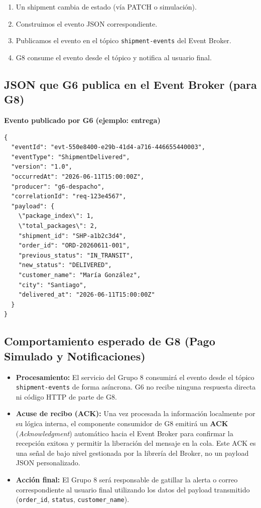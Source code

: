 \documentclass[11pt, a4paper]{article}
\newcommand{\contractheader}[1]{%
  \noindent\colorbox{primary!10}{%
    \parbox{\dimexpr\textwidth-2\fboxsep}{%
      \textbf{\faFileCode\quad #1}%
    }%
  }
  \vspace{0.3cm}
}
\begin{document}
\begin{enumerate}[noitemsep]
  \item Un shipment cambia de estado (vía PATCH o simulación).
  \item Construimos el evento JSON correspondiente.
  \item Publicamos el evento en el tópico \texttt{shipment-events} del Event Broker.
  \item G8 consume el evento desde el tópico y notifica al usuario final.
\end{enumerate}

\subsection{JSON que G6 publica en el Event Broker (para G8)}

\contractheader{Evento publicado por G6 (ejemplo: entrega)}

\begin{lstlisting}
{
  "eventId": "evt-550e8400-e29b-41d4-a716-446655440003",
  "eventType": "ShipmentDelivered",
  "version": "1.0",
  "occurredAt": "2026-06-11T15:00:00Z",
  "producer": "g6-despacho",
  "correlationId": "req-123e4567",
  "payload": {
    \"package_index\": 1,
    \"total_packages\": 2,
    "shipment_id": "SHP-a1b2c3d4",
    "order_id": "ORD-20260611-001",
    "previous_status": "IN_TRANSIT",
    "new_status": "DELIVERED",
    "customer_name": "María González",
    "city": "Santiago",
    "delivered_at": "2026-06-11T15:00:00Z"
  }
}
\end{lstlisting}

\subsection{Comportamiento esperado de G8 (Pago Simulado y Notificaciones)}

\begin{itemize}[noitemsep]
  \item \textbf{Procesamiento:} El servicio del Grupo 8 consumirá el evento
    desde el tópico \texttt{shipment-events} de forma asíncrona. G6 no recibe
    ninguna respuesta directa ni código HTTP de parte de G8.
  \item \textbf{Acuse de recibo (ACK):} Una vez procesada la información
    localmente por su lógica interna, el componente consumidor de G8 emitirá un
    \textbf{ACK} (\textit{Acknowledgment}) automático hacia el Event Broker para
    confirmar la recepción exitosa y permitir la liberación del mensaje en la
    cola. Este ACK es una señal de bajo nivel gestionada por la librería del
    Broker, no un payload JSON personalizado.
  \item \textbf{Acción final:} El Grupo 8 será responsable de gatillar la
    alerta o correo correspondiente al usuario final utilizando los datos del
    payload transmitido (\texttt{order\_id}, \texttt{status},
    \texttt{customer\_name}).
\end{itemize}
\end{document}
